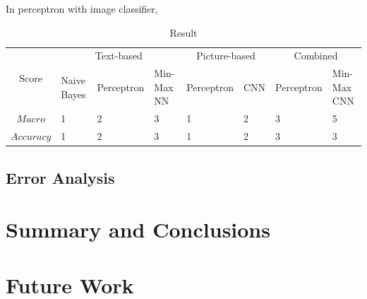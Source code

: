 \documentclass[11pt]{article}
\begin{document}
In perceptron with image classifier,
 
\begin{table}
\begin{center}
  \caption{Result}
  
  \begin{tabular}{|c||l|l|l|l|l|l|l|}
  \hline
  \multirow{2}{*}{Score} 
      & \multicolumn{3}{c|}{Text-based } 
          & \multicolumn{2}{|c|}{Picture-based }
          &          \multicolumn{2}{|c|}{Combined} \\             \cline{2-8}
  & Naive Bayes & Perceptron & Min-Max NN & Perceptron & CNN & Perceptron & Min-Max CNN   \\  \hline
  $Macro$ & 1 & 2 & 3 & 1 & 2 & 3 & 5 \\      \hline
  $Accuracy$ & 1 & 2 & 3 & 1 & 2 & 3 & 3 \\      \hline
\end{tabular}

\end{center}
\end{table}


\subsection{Error Analysis}
\label{ssec:erroranalysis}



\section{Summary and Conclusions}


\section{Future Work}
\label{sec:length}




\end{document}
